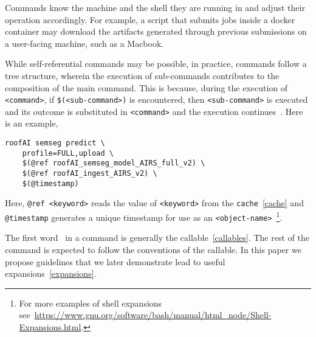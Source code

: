 Commands know the machine and the shell they are running in and adjust their operation accordingly. For example, a script that submits jobs inside a docker container may download the artifacts generated through previous submissions on a user-facing machine, such as a Macbook. 

While self-referential commands may be possible, in practice, commands follow a tree structure, wherein the execution of sub-commands contributes to the composition of the main command. This is because, during the execution of \texttt{<command>}, if \texttt{\$(<sub-command>)} is encountered, then \texttt{<sub-command>} is executed and its outcome is substituted in \texttt{<command>} and the execution continues~. Here is an example,
%
\begin{verbatim}
roofAI semseg predict \
    profile=FULL,upload \
    $(@ref roofAI_semseg_model_AIRS_full_v2) \
    $(@ref roofAI_ingest_AIRS_v2) \
    $(@timestamp)
\end{verbatim}
%
Here, \texttt{@ref <keyword>} reads the value of \texttt{<keyword>} from the \texttt{cache}~\ref{cache} and \texttt{@timestamp} generates a unique timestamp for use as an \texttt{<object-name>}~\footnote{For more examples of shell expansions see~\url{https://www.gnu.org/software/bash/manual/html\_node/Shell-Expansions.html}.}.

The first word~ in a command is generally the callable~\ref{callables}. The rest of the command is expected to follow the conventions of the callable. In this paper we propose guidelines that we later demonstrate lead to useful expansions~\ref{expansions}.




